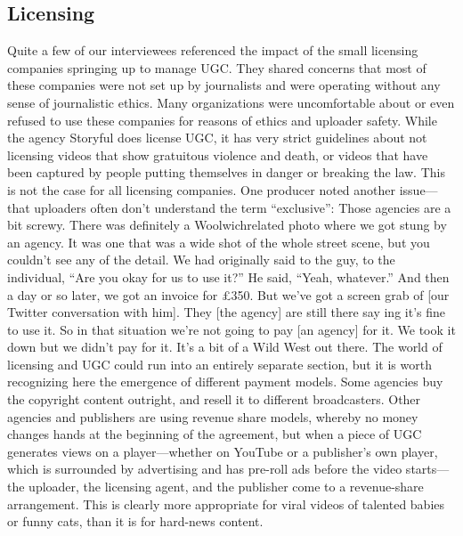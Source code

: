 \begin{enumerate}
\section{Licensing}
Quite a few of our interviewees referenced the impact of the small licensing
companies springing up to manage UGC. They shared concerns that
most of these companies were not set up by journalists and were operating
without any sense of journalistic ethics. Many organizations were uncomfortable
about or even refused to use these companies for reasons of ethics
and uploader safety.
While the agency Storyful does license UGC, it has very strict guidelines
about not licensing videos that show gratuitous violence and death, or videos
that have been captured by people putting themselves in danger or
breaking the law. This is not the case for all licensing companies.
One producer noted another issue—that uploaders often don't understand
the term ``exclusive'':
Those agencies are a bit screwy. There was definitely a Woolwichrelated
photo where we got stung by an agency. It was one that was
a wide shot of the whole street scene, but you couldn't see any of the
detail. We had originally said to the guy, to the individual, ``Are you
okay for us to use it?'' He said, ``Yeah, whatever.'' And then a day or so
later, we got an invoice for £350. But we've got a screen grab of [our
Twitter conversation with him]. They [the agency] are still there say
ing it's fine to use it. So in that situation we're not going to pay [an
agency] for it. We took it down but we didn't pay for it. It's a bit of a
Wild West out there.
The world of licensing and UGC could run into an entirely separate section,
but it is worth recognizing here the emergence of different payment
models. Some agencies buy the copyright content outright, and resell it to
different broadcasters. Other agencies and publishers are using revenue
share models, whereby no money changes hands at the beginning of the
agreement, but when a piece of UGC generates views on a player—whether
on YouTube or a publisher's own player, which is surrounded by advertising
and has pre-roll ads before the video starts—the uploader, the licensing
agent, and the publisher come to a revenue-share arrangement. This is
clearly more appropriate for viral videos of talented babies or funny cats,
than it is for hard-news content.

\end{enumerate}
